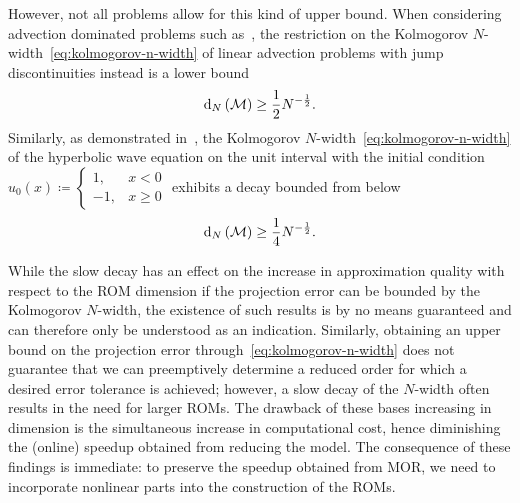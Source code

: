However, not all problems allow for this kind of upper bound.
When considering advection dominated problems such as~\cite[Section~5.1]{Ohlberger2016}, the restriction on the Kolmogorov $N$-width~\eqref{eq:kolmogorov-n-width} of linear advection problems with jump discontinuities instead is a lower bound
\begin{equation*}
    \mathop{}\!\mathrm{d}_N\left(\mathcal{M}\right) \geq \frac{1}{2} N^{- \frac{1}{2}}.
\end{equation*}
Similarly, as demonstrated in~\cite{Greif2019}, the Kolmogorov $N$-width~\eqref{eq:kolmogorov-n-width} of the hyperbolic wave equation on the unit interval with the initial condition $u_0(x) \coloneqq \begin{cases}
    1, & x < 0 \\
    -1, & x \geq 0
\end{cases}$ exhibits a decay bounded from below
\begin{equation*}
    \mathop{}\!\mathrm{d}_N\left(\mathcal{M}\right) \geq \frac{1}{4} N^{- \frac{1}{2}}.
\end{equation*}

While the slow decay has an effect on the increase in approximation quality with respect to the \ac{ROM} dimension if the projection error can be bounded by the Kolmogorov $N$-width, the existence of such results is by no means guaranteed and can therefore only be understood as an indication.
Similarly, obtaining an upper bound on the projection error through~\eqref{eq:kolmogorov-n-width} does not guarantee that we can preemptively determine a reduced order for which a desired error tolerance is achieved; however, a slow decay of the $N$-width often results in the need for larger \acp{ROM}.
The drawback of these bases increasing in dimension is the simultaneous increase in computational cost, hence diminishing the (online) speedup obtained from reducing the model.
The consequence of these findings is immediate: to preserve the speedup obtained from \ac{MOR}, we need to incorporate nonlinear parts into the construction of the \acp{ROM}.
